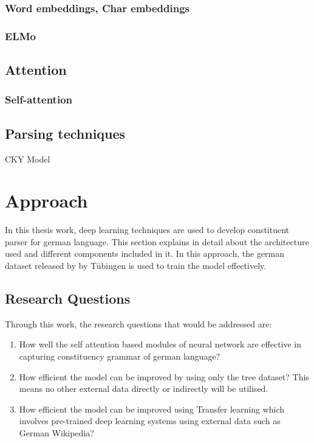 \documentclass[a4paper, 11pt]{article}
\begin{document}
\subsubsection{Word embeddings, Char embeddings}


\subsubsection{ELMo}


\subsection{Attention}

\subsubsection{Self-attention}

\subsection{Parsing techniques}

CKY Model

\pagebreak
\section{Approach}  

In this thesis work, deep learning techniques are used to develop constituent parser for german language. This section explains in detail about the architecture used and different components included in it. In this approach, the german dataset released by by Tübingen is used to train the model effectively.

\subsection{Research Questions}

Through this work, the research questions that would be addressed are:
\begin{enumerate}
\item How well the self attention based modules of neural network are effective in capturing constituency grammar of german language? 
\item How efficient the model can be improved by using only the tree dataset? This means no other external data directly or indirectly will be utilised. 
\item How efficient the model can be improved using Transfer learning which involves pre-trained deep learning systems using external data such as German Wikipedia?
\end{enumerate}
\end{document}

